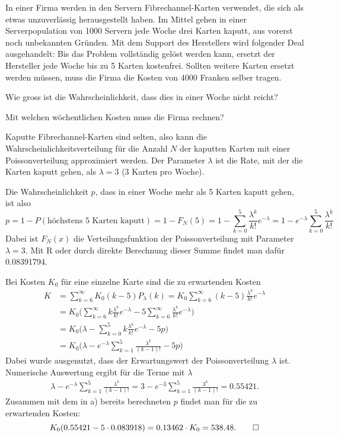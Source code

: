 In einer Firma werden in den Servern Fibrechannel-Karten verwendet,
die sich als etwas unzuverlässig herausgestellt haben.
Im Mittel gehen in einer Serverpopulation von 1000 Servern jede Woche
drei Karten kaputt, aus vorerst noch unbekannten Gründen.
Mit dem Support des Herstellers wird folgender Deal
ausgehandelt: Bis das Problem vollständig gelöst werden kann, 
ersetzt der Hersteller jede Woche bis zu 5 Karten kostenfrei.
Sollten weitere Karten ersetzt werden müssen, muss die Firma
die Kosten von 4000 Franken selber tragen.
\begin{teilaufgaben}
\item
Wie gross ist die Wahrscheinlichkeit, dass dies in einer Woche nicht
reicht?
\item
Mit welchen wöchentlichen Kosten muss die Firma rechnen?
\end{teilaufgaben}


\begin{loesung}
Kaputte Fibrechannel-Karten sind selten, also kann
die Wahrscheinlichkeitsverteilung für die Anzahl $N$ der kaputten Karten
mit einer Poissonverteilung approximiert werden. Der Parameter $\lambda$
ist die Rate, mit der die Karten kaputt gehen, als $\lambda=3$ (3 Karten
pro Woche).
\begin{teilaufgaben}
\item
Die Wahrscheinlichkeit $p$, dass in einer Woche mehr als 5 Karten kaputt
gehen, ist also
\[
p=1-P(\text{höchstens 5 Karten kaputt})=1-F_N(5)
=1-\sum_{k=0}^5\frac{\lambda^k}{k!}e^{-\lambda}
=1-e^{-\lambda}\sum_{k=0}^5\frac{\lambda^k}{k!}
\]
Dabei ist $F_N(x)$ die Verteilungsfunktion der Poissonverteilung mit
Parameter $\lambda=3$. Mit R oder durch direkte Berechnung dieser
Summe findet man dafür 0.08391794.
\item
Bei Kosten $K_0$ für eine einzelne Karte sind die zu erwartenden Kosten 
\begin{align*}
K
&=
\sum_{k=6}^\infty K_0(k-5)P_\lambda(k)
=
K_0
\sum_{k=6}^\infty (k-5)\frac{\lambda^k}{k!}e^{-\lambda}
\\
&=
K_0\biggl(
\sum_{k=6}^\infty k\frac{\lambda^k}{k!}e^{-\lambda}
-5\sum_{k=6}^\infty \frac{\lambda^k}{k!}e^{-\lambda}
\biggr)
\\
&=
K_0\biggl(
\lambda-\sum_{k=0}^5k\frac{\lambda^k}{k!}e^{-\lambda}
-5p
\biggr)
\\
&=
K_0\biggl(\lambda- e^{-\lambda}\sum_{k=1}^5\frac{\lambda^k}{(k-1)!} -5p\biggr)
\end{align*}
Dabei wurde ausgenutzt, dass der Erwartungswert der Poissonverteilung
$\lambda$ ist.
Numerische Auswertung ergibt für die Terme mit $\lambda$
\begin{align*}
\lambda-e^{-\lambda}\sum_{k=1}^5\frac{\lambda^k}{(k-1)!}
=
3-e^{-3}\sum_{k=1}^5\frac{3^k}{(k-1)!}
=0.55421.
\end{align*}
Zusammen mit dem in a) bereits berechneten $p$ findet man für die
zu erwartenden Kosten:
\[
K_0(0.55421 - 5\cdot 0.083918)=0.13462\cdot K_0 = 538.48.
\qedhere
\]
\end{teilaufgaben}
\end{loesung}
